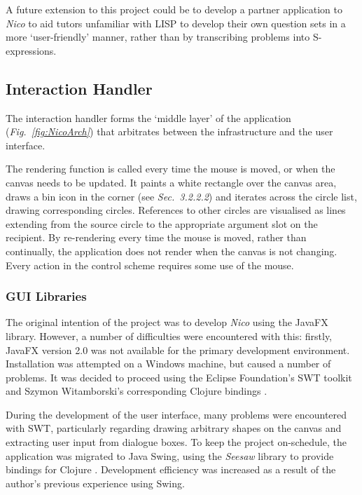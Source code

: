 \documentclass[12pt,twoside,notitlepage,xetex]{report}
\begin{document}
A future extension to this project could be to develop a partner application to \emph{Nico} to aid tutors unfamiliar with LISP to develop their own question sets in a more `user-friendly' manner, rather than by transcribing problems into S-expressions.

\subsection{Interaction Handler}
%

The interaction handler forms the `middle layer' of the application (\emph{Fig.~\ref{fig:NicoArch}}) that arbitrates between the infrastructure and the user interface.

The rendering function is called every time the mouse is moved, or when the canvas needs to be updated.  It paints a white rectangle over the canvas area, draws a bin icon in the corner (see \emph{Sec.~3.2.2.2}) and iterates across the circle list, drawing corresponding circles.  References to other circles are visualised as lines extending from the source circle to the appropriate argument slot on the recipient.  By re-rendering every time the mouse is moved, rather than continually, the application does not render when the canvas is not changing.  Every action in the control scheme requires some use of the mouse.

\subsubsection{GUI Libraries}

The original intention of the project was to develop \emph{Nico} using the JavaFX library. However, a number of difficulties were encountered with this: firstly, JavaFX version 2.0 was not available for the primary development environment.  Installation was attempted on a Windows machine, but caused a number of problems. It was decided to proceed using the Eclipse Foundation's SWT toolkit and Szymon Witamborski's corresponding Clojure bindings \cite{GuiFtw}.

During the development of the user interface, many problems were encountered with SWT, particularly regarding drawing arbitrary shapes on the canvas and extracting user input from dialogue boxes.  To keep the project on-schedule, the application was migrated to Java Swing, using the \emph{Seesaw} library to provide bindings for Clojure \cite{Seesaw}.  Development efficiency was increased as a result of the author's previous experience using Swing.
\end{document}
